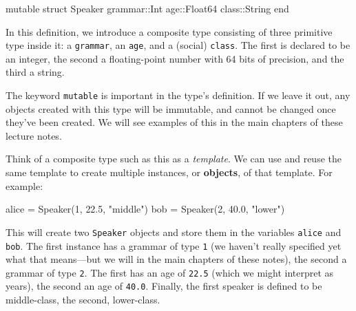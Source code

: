 \documentclass[
  letterpaper,
  DIV=11,
  numbers=noendperiod]{scrartcl}
\newenvironment{Shaded}{\begin{snugshade}}{\end{snugshade}}
\newcommand{\DataTypeTok}[1]{\textcolor[rgb]{0.68,0.00,0.00}{#1}}
\newcommand{\FloatTok}[1]{\textcolor[rgb]{0.68,0.00,0.00}{#1}}
\newcommand{\FunctionTok}[1]{\textcolor[rgb]{0.28,0.35,0.67}{#1}}
\newcommand{\KeywordTok}[1]{\textcolor[rgb]{0.00,0.23,0.31}{#1}}
\newcommand{\NormalTok}[1]{\textcolor[rgb]{0.00,0.23,0.31}{#1}}
\newcommand{\OperatorTok}[1]{\textcolor[rgb]{0.37,0.37,0.37}{#1}}
\newcommand{\StringTok}[1]{\textcolor[rgb]{0.13,0.47,0.30}{#1}}
\begin{document}
\begin{Shaded}
\begin{Highlighting}[]
\KeywordTok{mutable struct}\NormalTok{ Speaker}
\NormalTok{  grammar}\OperatorTok{::}\DataTypeTok{Int}
\NormalTok{  age}\OperatorTok{::}\DataTypeTok{Float64}
\NormalTok{  class}\OperatorTok{::}\DataTypeTok{String}
\KeywordTok{end}
\end{Highlighting}
\end{Shaded}

In this definition, we introduce a composite type consisting of three
primitive type inside it: a \texttt{grammar}, an \texttt{age}, and a
(social) \texttt{class}. The first is declared to be an integer, the
second a floating-point number with 64 bits of precision, and the third
a string.

\begin{tcolorbox}[enhanced jigsaw, left=2mm, colbacktitle=quarto-callout-note-color!10!white, titlerule=0mm, breakable, arc=.35mm, opacitybacktitle=0.6, coltitle=black, opacityback=0, toprule=.15mm, bottomrule=.15mm, colframe=quarto-callout-note-color-frame, bottomtitle=1mm, rightrule=.15mm, leftrule=.75mm, colback=white, toptitle=1mm, title=\textcolor{quarto-callout-note-color}{\faInfo}\hspace{0.5em}{Note}]

The keyword \texttt{mutable} is important in the type's definition. If
we leave it out, any objects created with this type will be immutable,
and cannot be changed once they've been created. We will see examples of
this in the main chapters of these lecture notes.

\end{tcolorbox}

Think of a composite type such as this as a \emph{template}. We can use
and reuse the same template to create multiple instances, or
\textbf{objects}, of that template. For example:

\begin{Shaded}
\begin{Highlighting}[]
\NormalTok{alice }\OperatorTok{=} \FunctionTok{Speaker}\NormalTok{(}\FloatTok{1}\NormalTok{, }\FloatTok{22.5}\NormalTok{, }\StringTok{"middle"}\NormalTok{)}
\NormalTok{bob }\OperatorTok{=} \FunctionTok{Speaker}\NormalTok{(}\FloatTok{2}\NormalTok{, }\FloatTok{40.0}\NormalTok{, }\StringTok{"lower"}\NormalTok{)}
\end{Highlighting}
\end{Shaded}

This will create two \texttt{Speaker} objects and store them in the
variables \texttt{alice} and \texttt{bob}. The first instance has a
grammar of type \texttt{1} (we haven't really specified yet what that
means---but we will in the main chapters of these notes), the second a
grammar of type \texttt{2}. The first has an age of \texttt{22.5} (which
we might interpret as years), the second an age of \texttt{40.0}.
Finally, the first speaker is defined to be middle-class, the second,
lower-class.
\end{document}
